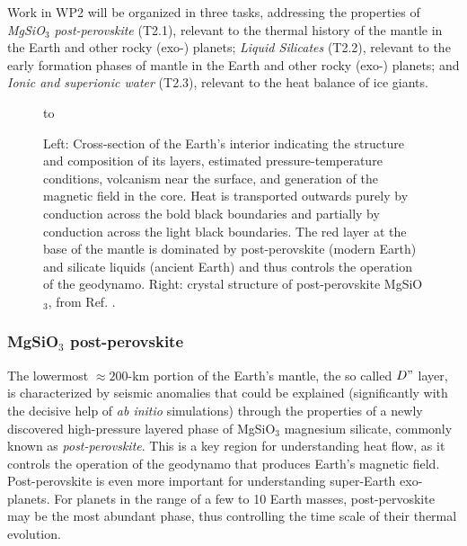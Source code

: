 
Work in WP2 will be organized in three tasks, addressing the properties of \emph{MgSiO$_3$ post-perovskite} (T2.1), relevant to the thermal history of the mantle in the Earth and other rocky (exo-) planets; \emph{Liquid Silicates} (T2.2), relevant to the early formation phases of mantle in the Earth and other rocky (exo-) planets; and \emph{Ionic and superionic water} (T2.3), relevant to the heat balance of ice giants.  

\begin{figure}[h]
\hbox to 

\caption{Left: Cross-section of the Earth’s interior indicating the structure and composition of its layers, estimated pressure-temperature conditions, volcanism near the surface, and generation of the magnetic field in the core.  Heat is transported outwards purely by conduction across the bold black boundaries and partially by conduction across the light black boundaries. The red layer at the base of the mantle is dominated by post-perovskite (modern Earth) and silicate liquids (ancient Earth) and thus controls the operation of the geodynamo. Right: crystal structure of post-perovskite MgSiO$_3$, from Ref. . \label{fig:MantleConvection}} 
\vspace{-3mm}
\end{figure}

\subsubsection{MgSiO\texorpdfstring{$_3$}{} post-perovskite}
The lowermost $\approx 200$-km portion of the Earth's mantle, the so called $D"$ layer, is characterized by seismic anomalies that could be explained (significantly with the decisive help of \emph{ab initio} simulations) through the properties of a newly discovered high-pressure layered phase of MgSiO$_3$ magnesium silicate, commonly known as \emph{post-perovskite}.\cite{TsuchiyaEPSL04} This is a key region for understanding heat flow, as it controls the operation of the geodynamo that produces Earth’s magnetic field.\cite{gubbinsetal_11} Post-perovskite is even more important for understanding super-Earth exo-planets. For planets in the range of a few to 10 Earth masses, post-pervoskite may be the most abundant phase,\cite{niuetal_15} thus controlling the time scale of their thermal evolution.

